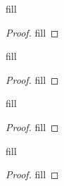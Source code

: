 \begin{exercise}{65}
fill
\end{exercise}
\begin{proof}
fill
\end{proof} 

\begin{exercise}{67}
fill
\end{exercise}
\begin{proof}
fill
\end{proof} 

\begin{exercise}{69}
fill
\end{exercise}
\begin{proof}
fill
\end{proof} 

\begin{exercise}{70}
fill
\end{exercise}
\begin{proof}
fill
\end{proof} 
